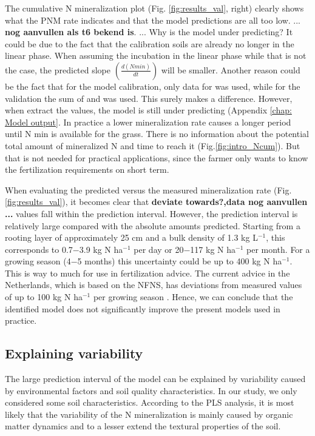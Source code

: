 \documentclass[10pt,twoside,dutch,english]{report}
\begin{document}
The cumulative N mineralization plot (Fig. \ref{fig:results_val}, right) clearly shows what the PNM rate indicates and that the model predictions are all too low. ... \textbf{nog aanvullen als t6 bekend is}. ... Why is the model under predicting? It could be due to the fact that the calibration soils are already no longer in the linear phase. When assuming the incubation in the linear phase while that is not the case, the predicted slope $(\frac{d(Nmin)}{dt})$ will be smaller. Another reason could be the fact that for the model calibration, only data for  was used, while for the validation the sum of  and  was used. This surely makes a difference. However, when extract the  values, the model is still under predicting (Appendix \ref{chap: Model output}. In practice a lower mineralization rate causes a longer period until N min is available for the grass.  There is no information about the potential total amount of mineralized N and time to reach it (Fig.\ref{fig:intro_Ncum}). But that is not needed for practical applications, since the farmer only wants to know the fertilization requirements on short term. 

When evaluating the predicted versus the measured mineralization rate (Fig. \ref{fig:results_val}), it becomes clear that \textbf{deviate towards?,data nog aanvullen ...} values fall within the prediction interval. However, the prediction interval is relatively large compared with the absolute amounts predicted. Starting from a rooting layer of approximately 25 cm and a bulk density of 1.3 kg L$^{-1}$, this corresponds to 0.7$-$3.9 kg N ha$^{-1}$ per day or 20$-$117 kg N ha$^{-1}$ per month. For a growing season (4$-$5 months) this uncertainty could be up to 400 kg N ha$^{-1}$.   This is way to much for use in fertilization advice. The current advice in the Netherlands, which is based on the NFNS, has deviations from measured values of up to 100 kg N ha$^{-1}$ per growing season \citep{Ros2015}. Hence, we can conclude that the identified model does not significantly improve the present models used in practice. 





\subsection{Explaining variability}
The large prediction interval of the model can be explained by variability caused by environmental factors and soil quality characteristics. In our study, we only considered some soil characteristics. According to the PLS analysis, it is most likely that the variability of the N mineralization is mainly caused by organic matter dynamics and to a lesser extend the textural properties of the soil. 
\end{document}
